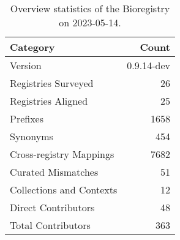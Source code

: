 \begin{table}
\caption{Overview statistics of the Bioregistry on 2023-05-14.}
\label{tab:bioregistry-summary}
\begin{tabular}{lr}
\toprule
Category & Count \\
\midrule
Version & 0.9.14-dev \\
Registries Surveyed & 26 \\
Registries Aligned & 25 \\
Prefixes & 1658 \\
Synonyms & 454 \\
Cross-registry Mappings & 7682 \\
Curated Mismatches & 51 \\
Collections and Contexts & 12 \\
Direct Contributors & 48 \\
Total Contributors & 363 \\
\bottomrule
\end{tabular}
\end{table}

